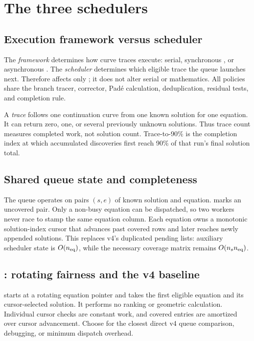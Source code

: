 \section{The three  schedulers}\label{sec:schedulers}

\subsection{Execution framework versus scheduler}
The \emph{framework} determines how curve traces execute: serial, synchronous
, or asynchronous . The \emph{scheduler} determines
which eligible trace the  queue launches next. Therefore
 affects only ; it does not
alter serial or  mathematics. All policies share the branch tracer,
corrector, Pad\'e calculation, deduplication, residual tests, and completion rule.

A \emph{trace} follows one continuation curve from one known solution for one
equation. It can return zero, one, or several previously unknown solutions.
Thus trace count measures completed work, not solution count. Trace-to-90\% is
the completion index at which accumulated discoveries first reach 90\% of that
run's final solution total.

\subsection{Shared queue state and completeness}
The queue operates on pairs $(s,e)$ of known solution and equation.
 marks an uncovered pair. Only a non-busy equation can be
dispatched, so two workers never race to stamp the same equation column.
Each equation owns a monotonic solution-index cursor that advances past covered
rows and later reaches newly appended solutions. This replaces v4's duplicated
pending lists: auxiliary scheduler state is $O(n_{\rm eq})$, while the necessary
coverage matrix remains $O(n_s n_{\rm eq})$.

\subsection{: rotating fairness and the v4 baseline}
 starts at a rotating equation pointer and takes the first eligible
equation and its cursor-selected solution. It performs no ranking or geometric
calculation. Individual cursor checks are constant work, and covered entries are
amortized over cursor advancement. Choose  for the closest direct v4
queue comparison, debugging, or minimum dispatch overhead.

